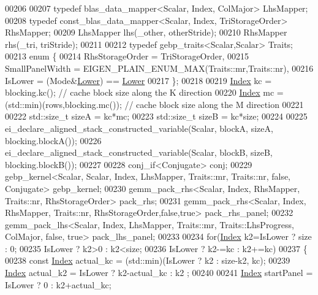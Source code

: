 \begin{DoxyCode}
00206 
00207     \textcolor{keyword}{typedef} blas\_data\_mapper<Scalar, Index, ColMajor> LhsMapper;
00208     \textcolor{keyword}{typedef} const\_blas\_data\_mapper<Scalar, Index, TriStorageOrder> RhsMapper;
00209     LhsMapper lhs(\_other, otherStride);
00210     RhsMapper rhs(\_tri, triStride);
00211 
00212     \textcolor{keyword}{typedef} gebp\_traits<Scalar,Scalar> Traits;
00213     \textcolor{keyword}{enum} \{
00214       RhsStorageOrder   = TriStorageOrder,
00215       SmallPanelWidth   = EIGEN\_PLAIN\_ENUM\_MAX(Traits::mr,Traits::nr),
00216       IsLower = (Mode&\hyperlink{group__enums_gga39e3366ff5554d731e7dc8bb642f83cda891792b8ed394f7607ab16dd716f60e6}{Lower}) == \hyperlink{group__enums_gga39e3366ff5554d731e7dc8bb642f83cda891792b8ed394f7607ab16dd716f60e6}{Lower}
00217     \};
00218 
00219     \hyperlink{namespace_eigen_a62e77e0933482dafde8fe197d9a2cfde}{Index} kc = blocking.kc();                   \textcolor{comment}{// cache block size along the K direction}
00220     \hyperlink{namespace_eigen_a62e77e0933482dafde8fe197d9a2cfde}{Index} mc = (std::min)(rows,blocking.mc());  \textcolor{comment}{// cache block size along the M direction}
00221 
00222     std::size\_t sizeA = kc*mc;
00223     std::size\_t sizeB = kc*size;
00224 
00225     ei\_declare\_aligned\_stack\_constructed\_variable(Scalar, blockA, sizeA, blocking.blockA());
00226     ei\_declare\_aligned\_stack\_constructed\_variable(Scalar, blockB, sizeB, blocking.blockB());
00227 
00228     conj\_if<Conjugate> conj;
00229     gebp\_kernel<Scalar, Scalar, Index, LhsMapper, Traits::mr, Traits::nr, false, Conjugate> gebp\_kernel;
00230     gemm\_pack\_rhs<Scalar, Index, RhsMapper, Traits::nr, RhsStorageOrder> pack\_rhs;
00231     gemm\_pack\_rhs<Scalar, Index, RhsMapper, Traits::nr, RhsStorageOrder,false,true> pack\_rhs\_panel;
00232     gemm\_pack\_lhs<Scalar, Index, LhsMapper, Traits::mr, Traits::LhsProgress, ColMajor, false, true> 
      pack\_lhs\_panel;
00233 
00234     \textcolor{keywordflow}{for}(\hyperlink{namespace_eigen_a62e77e0933482dafde8fe197d9a2cfde}{Index} k2=IsLower ? size : 0;
00235         IsLower ? k2>0 : k2<size;
00236         IsLower ? k2-=kc : k2+=kc)
00237     \{
00238       \textcolor{keyword}{const} \hyperlink{namespace_eigen_a62e77e0933482dafde8fe197d9a2cfde}{Index} actual\_kc = (std::min)(IsLower ? k2 : size-k2, kc);
00239       \hyperlink{namespace_eigen_a62e77e0933482dafde8fe197d9a2cfde}{Index} actual\_k2 = IsLower ? k2-actual\_kc : k2 ;
00240 
00241       \hyperlink{namespace_eigen_a62e77e0933482dafde8fe197d9a2cfde}{Index} startPanel = IsLower ? 0 : k2+actual\_kc;

\end{DoxyCode}

